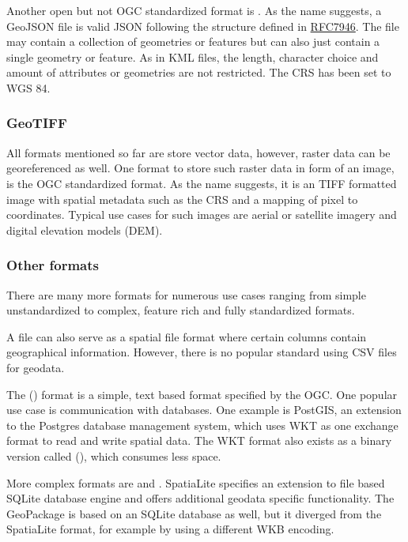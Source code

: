 			Another open but not OGC standardized format is .
			As the name suggests, a GeoJSON file is valid JSON following the structure defined in \href{https://datatracker.ietf.org/doc/html/rfc7946}{RFC7946}\cite{ietf-geojson}.
			The file may contain a collection of geometries or features but can also just contain a single geometry or feature.
			As in KML files, the length, character choice and amount of attributes or geometries are not restricted.
			The CRS has been set to WGS 84.
			
		\subsubsection{GeoTIFF}
		
			All formats mentioned so far are store vector data, however, raster data can be georeferenced as well.
			One format to store such raster data in form of an image, is the OGC standardized  format.
			As the name suggests, it is an TIFF formatted image with spatial metadata such as the CRS and a mapping of pixel to coordinates\cite{ogc-geotiff}.
			Typical use cases for such images are aerial or satellite imagery and digital elevation models (DEM).
		
		\subsubsection{Other formats}
		
		
			There are many more formats for numerous use cases ranging from simple unstandardized to complex, feature rich and fully standardized formats.
			
			A  file can also serve as a spatial file format where certain columns contain geographical information.
			However, there is no popular standard using CSV files for geodata.
			
			The  () format is a simple, text based format specified by the OGC\cite[51]{ogc-sfa}.
			One popular use case is communication with databases.
			One example is PostGIS, an extension to the Postgres database management system, which uses WKT as one exchange format to read and write spatial data\cite{postgis-doc-wkt}.
			The WKT format also exists as a binary version called  (), which consumes less space.
			
			More complex formats are  and .
			SpatiaLite specifies an extension to file based SQLite database engine and offers additional geodata specific functionality\cite{spatialite-website}.
			The GeoPackage is based on an SQLite database as well, but it diverged from the SpatiaLite format, for example by using a different WKB encoding\cite{geopackage-faq}.
			
